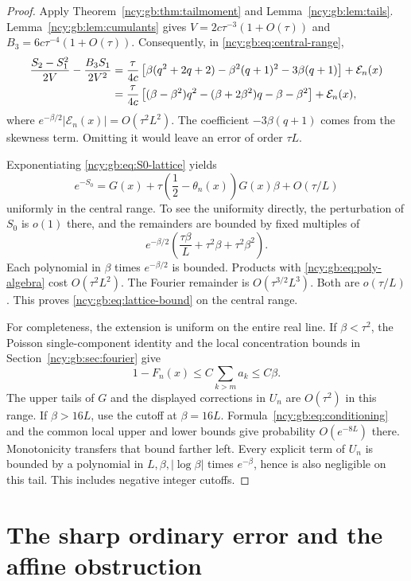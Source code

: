 \documentclass[11pt,letterpaper]{article}
\numberwithin{equation}{section}
\theoremstyle{remark}\newtheorem{remark}[theorem]{Remark}
\theoremstyle{definition}\newtheorem{definition}[theorem]{Definition}\theoremstyle{plain}
\newcommand{\cE}{\mathcal E}
\begin{document}
\begin{proof}
Apply Theorem~\ref{ncy:gb:thm:tailmoment} and Lemma~\ref{ncy:gb:lem:tails}.
Lemma~\ref{ncy:gb:lem:cumulants} gives
\(V=2c\tau^{-3}(1+O(\tau))\) and
\(B_3=6c\tau^{-4}(1+O(\tau))\).
Consequently, in \eqref{ncy:gb:eq:central-range},
\begin{align}
 \frac{S_2-S_1^2}{2V}
 -\frac{B_3S_1}{2V^2}
 ={}&\frac{\tau}{4c}
 \left[\beta(q^2+2q+2)-\beta^2(q+1)^2
       -3\beta(q+1)\right]+\cE_n(x)\notag\\
 ={}&\frac{\tau}{4c}
 \left[(\beta-\beta^2)q^2-(\beta+2\beta^2)q-\beta-\beta^2\right]
 +\cE_n(x),
 \label{ncy:gb:eq:poly-algebra}
\end{align}
where
\(e^{-\beta/2}|\cE_n(x)|=O(\tau^2L^2)\).
The coefficient \(-3\beta(q+1)\) comes from the skewness term.
Omitting it would leave an error of order \(\tau L\).

Exponentiating \eqref{ncy:gb:eq:S0-lattice} yields
\[
 e^{-S_0}
 =G(x)+\tau\left(\frac12-\theta_n(x)\right)G(x)\beta
 +O(\tau/L)
\]
uniformly in the central range. To see the uniformity directly,
the perturbation of \(S_0\) is \(o(1)\) there, and the remainders are
bounded by fixed multiples of
\[
 e^{-\beta/2}
 \left(\frac{\tau\beta}{L}+\tau^2\beta+\tau^2\beta^2\right).
\]
Each polynomial in \(\beta\) times \(e^{-\beta/2}\) is bounded.
Products with \eqref{ncy:gb:eq:poly-algebra} cost
\(O(\tau^2L^2)\). The Fourier remainder is
\(O(\tau^{3/2}L^3)\). Both are \(o(\tau/L)\).
This proves \eqref{ncy:gb:eq:lattice-bound} on the central range.

For completeness, the extension is uniform on the entire real line.
If \(\beta<\tau^2\), the Poisson single-component identity and
the local concentration bounds in Section~\ref{ncy:gb:sec:fourier} give
\[
 1-F_n(x)\le C\sum_{k>m}a_k\le C\beta.
\]
The upper tails of \(G\) and the displayed corrections in \(U_n\)
are \(O(\tau^2)\) in this range. If \(\beta>16L\), use the cutoff
at \(\beta=16L\). Formula~\eqref{ncy:gb:eq:conditioning} and the common
local upper and lower bounds give probability \(O(e^{-8L})\)
there. Monotonicity transfers that bound farther left. Every
explicit term of \(U_n\) is bounded by a polynomial in
\(L,\beta,|\log\beta|\) times \(e^{-\beta}\), hence is also
negligible on this tail. This includes negative integer cutoffs.
\end{proof}

\section{The sharp ordinary error and the affine obstruction}
\label{ncy:gb:sec:affine}
\end{document}
